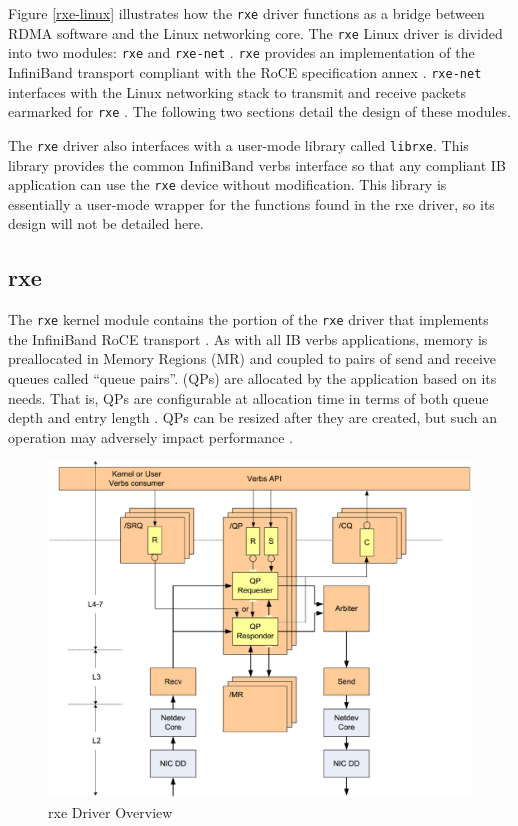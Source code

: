 \documentclass[11pt]{book}
\begin{document}
Figure \ref{rxe-linux} illustrates how the \verb;rxe; driver functions as a bridge between
RDMA software and the Linux networking core.  The \verb;rxe; Linux driver is divided into
two modules: \verb;rxe; and \verb;rxe-net; \cite{pearson-10}.  \verb;rxe; provides an
implementation of the InfiniBand transport compliant with the RoCE specification annex
\cite{InfiniBandTARoCE-10}.  \verb;rxe-net; interfaces with the Linux networking stack to
transmit and receive packets earmarked for \verb;rxe; \cite{pearson-10}.  The following two
sections detail the design of these modules.

The \verb;rxe; driver also interfaces with a user-mode library called \verb;librxe;.  This
library provides the common InfiniBand verbs interface so that any compliant IB
application can use the \verb;rxe; device without modification.  This library is
essentially a user-mode wrapper for the functions found in the rxe driver, so its design
will not be detailed here.

\subsection{rxe}\label{rxe}

The \verb;rxe; kernel module contains the portion of the \verb;rxe; driver that implements
the InfiniBand RoCE transport \cite{pearson-10}.  As with all IB verbs applications,
memory is preallocated in Memory Regions (MR) and coupled to pairs of send and receive
queues called ``queue pairs''.  (QPs) are allocated by the application based on its needs.
That is, QPs are configurable at allocation time in terms of both queue depth and entry
length \cite{InfiniBandTARoCE-10,InfiniBandTABase-07}.  QPs can be resized after they are
created, but such an operation may adversely impact performance
\cite{InfiniBandTARoCE-10}.

\begin{figure}[!t]
\includegraphics[width=\textwidth]{rxe_overview}
\caption{rxe Driver Overview \protect\cite{pearson-10}}\label{rxe-overview}
\end{figure}
\end{document}
